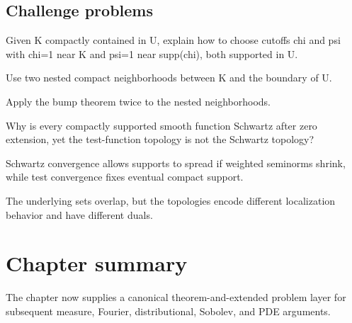 \subsection*{Challenge problems}

\begin{exercise}\label{exr:iii15-expand-15}
Given K compactly contained in U, explain how to choose cutoffs chi and psi with chi=1 near K and psi=1 near supp(chi), both supported in U.
\end{exercise}
\begin{hint}
Use two nested compact neighborhoods between K and the boundary of U.
\end{hint}
\begin{solution}
Apply the bump theorem twice to the nested neighborhoods.
\end{solution}

\begin{exercise}\label{exr:iii15-expand-16}
Why is every compactly supported smooth function Schwartz after zero extension, yet the test-function topology is not the Schwartz topology?
\end{exercise}
\begin{hint}
Schwartz convergence allows supports to spread if weighted seminorms shrink, while test convergence fixes eventual compact support.
\end{hint}
\begin{solution}
The underlying sets overlap, but the topologies encode different localization behavior and have different duals.
\end{solution}
\section*{Chapter summary}
The chapter now supplies a canonical theorem-and-extended problem layer for subsequent measure, Fourier, distributional, Sobolev, and PDE arguments.
